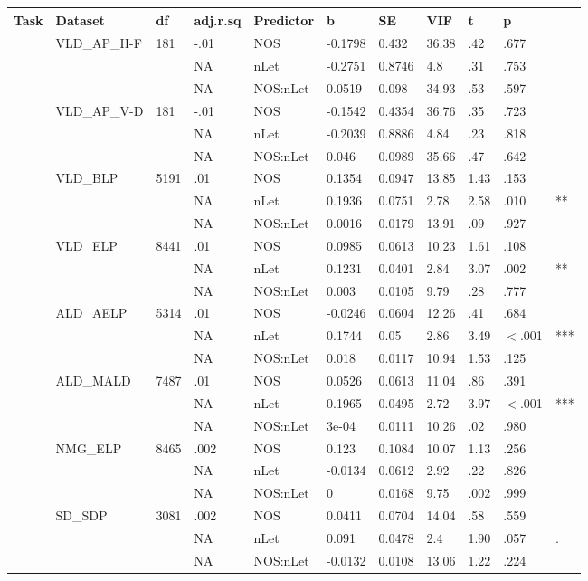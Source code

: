 \begin{table}[ht]
\centering
\begingroup\normalsize
\begin{tabular}{lllllllllll}
  \hline
Task & Dataset & df & adj.r.sq & Predictor & b & SE & VIF & t & p &  \\ 
  \hline
 & VLD\_AP\_H-F & 181 & -.01 & NOS & -0.1798 & 0.432 & 36.38 & .42 & .677 &   \\ 
   &  &  & NA & nLet & -0.2751 & 0.8746 & 4.8 & .31 & .753 &   \\ 
   &  &  & NA & NOS:nLet & 0.0519 & 0.098 & 34.93 & .53 & .597 &   \\ 
   & VLD\_AP\_V-D & 181 & -.01 & NOS & -0.1542 & 0.4354 & 36.76 & .35 & .723 &   \\ 
   &  &  & NA & nLet & -0.2039 & 0.8886 & 4.84 & .23 & .818 &   \\ 
   &  &  & NA & NOS:nLet & 0.046 & 0.0989 & 35.66 & .47 & .642 &   \\ 
   & VLD\_BLP & 5191 & .01 & NOS & 0.1354 & 0.0947 & 13.85 & 1.43 & .153 &   \\ 
   &  &  & NA & nLet & 0.1936 & 0.0751 & 2.78 & 2.58 & .010 & ** \\ 
   &  &  & NA & NOS:nLet & 0.0016 & 0.0179 & 13.91 & .09 & .927 &   \\ 
   & VLD\_ELP & 8441 & .01 & NOS & 0.0985 & 0.0613 & 10.23 & 1.61 & .108 &   \\ 
   &  &  & NA & nLet & 0.1231 & 0.0401 & 2.84 & 3.07 & .002 & ** \\ 
   &  &  & NA & NOS:nLet & 0.003 & 0.0105 & 9.79 & .28 & .777 &   \\ 
   & ALD\_AELP & 5314 & .01 & NOS & -0.0246 & 0.0604 & 12.26 & .41 & .684 &   \\ 
   &  &  & NA & nLet & 0.1744 & 0.05 & 2.86 & 3.49 & $<$.001 & *** \\ 
   &  &  & NA & NOS:nLet & 0.018 & 0.0117 & 10.94 & 1.53 & .125 &   \\ 
   & ALD\_MALD & 7487 & .01 & NOS & 0.0526 & 0.0613 & 11.04 & .86 & .391 &   \\ 
   &  &  & NA & nLet & 0.1965 & 0.0495 & 2.72 & 3.97 & $<$.001 & *** \\ 
   &  &  & NA & NOS:nLet & 3e-04 & 0.0111 & 10.26 & .02 & .980 &   \\ 
   & NMG\_ELP & 8465 & .002 & NOS & 0.123 & 0.1084 & 10.07 & 1.13 & .256 &   \\ 
   &  &  & NA & nLet & -0.0134 & 0.0612 & 2.92 & .22 & .826 &   \\ 
   &  &  & NA & NOS:nLet & 0 & 0.0168 & 9.75 & .002 & .999 &   \\ 
   & SD\_SDP & 3081 & .002 & NOS & 0.0411 & 0.0704 & 14.04 & .58 & .559 &   \\ 
   &  &  & NA & nLet & 0.091 & 0.0478 & 2.4 & 1.90 & .057 & . \\ 
   &  &  & NA & NOS:nLet & -0.0132 & 0.0108 & 13.06 & 1.22 & .224 &   \\ 
   \hline
\end{tabular}
\endgroup
\end{table}
